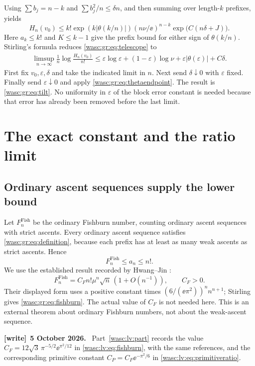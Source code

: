\documentclass[11pt,a4paper]{article}
\theoremstyle{remark}\newtheorem{remark}[theorem]{Remark}
\numberwithin{equation}{section}
\newenvironment{writenote}[1][]{\par\smallskip\begingroup\small
 \noindent\textbf{[write]}\if\relax\detokenize{#1}\relax\else~\textbf{#1.}\fi\ }%
 {\par\endgroup\smallskip}
\begin{document}
Using $\sum b_j=n-k$ and $\sum b_j^2/n\le\delta n$, and then summing over length-$k$ prefixes, yields
\begin{equation}\label{wasc:gr:eq:telescope}
H_n(v_0)\le k!\exp(k|\theta(k/n)|)
(n\nu/\ee)^{n-k}\exp\!\bigl(C(n\delta+J)\bigr).
\end{equation}
Here $a_k\le k!$ and $K\le k-1$ give the prefix bound for either sign of $\theta(k/n)$. Stirling's formula reduces \eqref{wasc:gr:eq:telescope} to
\begin{align}\label{wasc:gr:eq:orderedlimit}
\limsup_{n\to\infty}\frac1n\log\frac{H_n(v_0)}{n!}
\le \varepsilon\log\varepsilon+(1-\varepsilon)\log\nu
+\varepsilon|\theta(\varepsilon)|+C\delta.
\end{align}
First fix $v_0,\varepsilon,\delta$ and take the indicated limit in $n$. Next send $\delta\downarrow0$ with $\varepsilon$ fixed. Finally send $\varepsilon\downarrow0$ and apply \eqref{wasc:gr:eq:thetaendpoint}. The result is \eqref{wasc:gr:eq:tilt}. No uniformity in $\varepsilon$ of the block error constant is needed because that error has already been removed before the last limit.

\section{The exact constant and the ratio limit}\label{wasc:gr:sec:ratio}
\subsection{Ordinary ascent sequences supply the lower bound}
Let $F_n^{\mathrm{Fish}}$ be the ordinary Fishburn number, counting ordinary ascent sequences with strict ascents. Every ordinary ascent sequence satisfies \eqref{wasc:gr:eq:definition}, because each prefix has at least as many weak ascents as strict ascents. Hence
\begin{equation}\label{wasc:gr:eq:fishburninclusion}
F_n^{\mathrm{Fish}}\le a_n\le n!.
\end{equation}
We use the established result recorded by Hwang--Jin \cite[Eq.~(1.1)]{hwang}:
\begin{equation}\label{wasc:gr:eq:fishburn}
F_n^{\mathrm{Fish}}=C_F n!\mu^n\sqrt n\,(1+O(n^{-1})),
\qquad C_F>0.
\end{equation}
Their displayed form uses a positive constant times $(6/(\ee\pi^2))^n n^{n+1}$; Stirling gives \eqref{wasc:gr:eq:fishburn}. The actual value of $C_F$ is not needed here. This is an external theorem about ordinary Fishburn numbers, not about the weak-ascent sequence.
\begin{writenote}[5 October 2026]
Part~\ref{wasc:lv:part} records the value $C_F=12\sqrt3\,\pi^{-5/2}\ee^{\pi^2/12}$ in \eqref{wasc:lv:eq:fishburn}, with the same references, and the corresponding primitive constant $C_P=C_F\ee^{-\pi^2/6}$ in \eqref{wasc:lv:eq:primitiveratio}.
\end{writenote}
\end{document}
